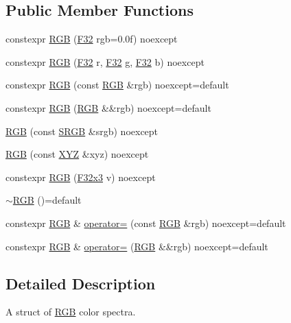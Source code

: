\subsection*{Public Member Functions}
\begin{DoxyCompactItemize}
\item 
constexpr \hyperlink{structmage_1_1_r_g_b_a166d2c13b46f9518c132c68f1117e5c6}{R\+GB} (\hyperlink{namespacemage_aa97e833b45f06d60a0a9c4fc22ae02c0}{F32} rgb=0.\+0f) noexcept
\item 
constexpr \hyperlink{structmage_1_1_r_g_b_af4304d8dc009f1b551442d6ebd15c0fa}{R\+GB} (\hyperlink{namespacemage_aa97e833b45f06d60a0a9c4fc22ae02c0}{F32} r, \hyperlink{namespacemage_aa97e833b45f06d60a0a9c4fc22ae02c0}{F32} g, \hyperlink{namespacemage_aa97e833b45f06d60a0a9c4fc22ae02c0}{F32} b) noexcept
\item 
constexpr \hyperlink{structmage_1_1_r_g_b_a1423c7c8dd83399b16cd33e367a5497c}{R\+GB} (const \hyperlink{structmage_1_1_r_g_b}{R\+GB} \&rgb) noexcept=default
\item 
constexpr \hyperlink{structmage_1_1_r_g_b_a852c4ed04bb38c7913d12fc491185bfb}{R\+GB} (\hyperlink{structmage_1_1_r_g_b}{R\+GB} \&\&rgb) noexcept=default
\item 
\hyperlink{structmage_1_1_r_g_b_a2f2c4eea3b0c44e0f31cfe20c6371d64}{R\+GB} (const \hyperlink{structmage_1_1_s_r_g_b}{S\+R\+GB} \&srgb) noexcept
\item 
\hyperlink{structmage_1_1_r_g_b_a62a2200960f84f1b6bd4b743510201a4}{R\+GB} (const \hyperlink{structmage_1_1_x_y_z}{X\+YZ} \&xyz) noexcept
\item 
constexpr \hyperlink{structmage_1_1_r_g_b_ab80d8120aabe4f52e8de6e99d1af7c8b}{R\+GB} (\hyperlink{namespacemage_a73fbe0da4b8d5bc156bb8453e5b63a17}{F32x3} v) noexcept
\item 
\hyperlink{structmage_1_1_r_g_b_a2c01428e1da4ec354b85320a905beab3}{$\sim$\+R\+GB} ()=default
\item 
constexpr \hyperlink{structmage_1_1_r_g_b}{R\+GB} \& \hyperlink{structmage_1_1_r_g_b_ad78ad1a23b801b19a0e8f747dec8637d}{operator=} (const \hyperlink{structmage_1_1_r_g_b}{R\+GB} \&rgb) noexcept=default
\item 
constexpr \hyperlink{structmage_1_1_r_g_b}{R\+GB} \& \hyperlink{structmage_1_1_r_g_b_a87257a9536e7b2eabd49553df67e8945}{operator=} (\hyperlink{structmage_1_1_r_g_b}{R\+GB} \&\&rgb) noexcept=default
\end{DoxyCompactItemize}


\subsection{Detailed Description}
A struct of \hyperlink{structmage_1_1_r_g_b}{R\+GB} color spectra. 

